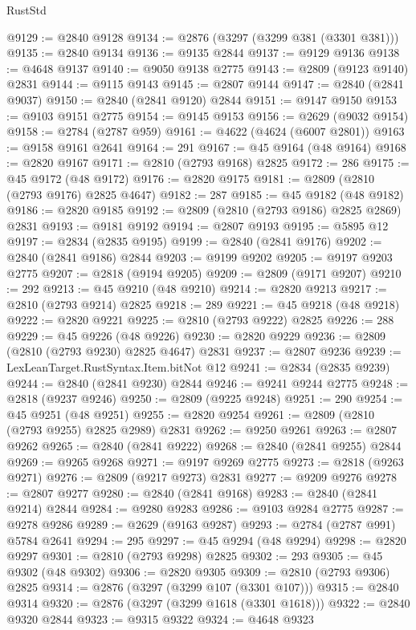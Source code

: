 \begin{lexlean}{RustStd}
\begin{coremodule}
{\begin{coremodule}
{{{{{{{{{{{{{{{{{{{{{{{{{{{{{{{{{@9129 := @2840 @9128
@9134 := @2876 (@3297 (@3299 @381 (@3301 @381)))
@9135 := @2840 @9134
@9136 := @9135 @2844
@9137 := @9129 @9136
@9138 := @4648 @9137
@9140 := @9050 @9138 @2775
@9143 := @2809 (@9123 @9140) @2831
@9144 := @9115 @9143
@9145 := @2807 @9144
@9147 := @2840 (@2841 @9037)
@9150 := @2840 (@2841 @9120) @2844
@9151 := @9147 @9150
@9153 := @9103 @9151 @2775
@9154 := @9145 @9153
@9156 := @2629 (@9032 @9154)
@9158 := @2784 (@2787 @959)
@9161 := @4622 (@4624 (@6007 @2801))
@9163 := @9158 @9161 @2641
@9164 := 291
@9167 := @45 @9164 (@48 @9164)
@9168 := @2820 @9167
@9171 := @2810 (@2793 @9168) @2825
@9172 := 286
@9175 := @45 @9172 (@48 @9172)
@9176 := @2820 @9175
@9181 := @2809 (@2810 (@2793 @9176) @2825 @4647)
@9182 := 287
@9185 := @45 @9182 (@48 @9182)
@9186 := @2820 @9185
@9192 := @2809 (@2810 (@2793 @9186) @2825 @2869) @2831
@9193 := @9181 @9192
@9194 := @2807 @9193
@9195 := @5895 @12
@9197 := @2834 (@2835 @9195)
@9199 := @2840 (@2841 @9176)
@9202 := @2840 (@2841 @9186) @2844
@9203 := @9199 @9202
@9205 := @9197 @9203 @2775
@9207 := @2818 (@9194 @9205)
@9209 := @2809 (@9171 @9207)
@9210 := 292
@9213 := @45 @9210 (@48 @9210)
@9214 := @2820 @9213
@9217 := @2810 (@2793 @9214) @2825
@9218 := 289
@9221 := @45 @9218 (@48 @9218)
@9222 := @2820 @9221
@9225 := @2810 (@2793 @9222) @2825
@9226 := 288
@9229 := @45 @9226 (@48 @9226)
@9230 := @2820 @9229
@9236 := @2809 (@2810 (@2793 @9230) @2825 @4647) @2831
@9237 := @2807 @9236
@9239 := LexLeanTarget.RustSyntax.Item.bitNot @12
@9241 := @2834 (@2835 @9239)
@9244 := @2840 (@2841 @9230) @2844
@9246 := @9241 @9244 @2775
@9248 := @2818 (@9237 @9246)
@9250 := @2809 (@9225 @9248)
@9251 := 290
@9254 := @45 @9251 (@48 @9251)
@9255 := @2820 @9254
@9261 := @2809 (@2810 (@2793 @9255) @2825 @2989) @2831
@9262 := @9250 @9261
@9263 := @2807 @9262
@9265 := @2840 (@2841 @9222)
@9268 := @2840 (@2841 @9255) @2844
@9269 := @9265 @9268
@9271 := @9197 @9269 @2775
@9273 := @2818 (@9263 @9271)
@9276 := @2809 (@9217 @9273) @2831
@9277 := @9209 @9276
@9278 := @2807 @9277
@9280 := @2840 (@2841 @9168)
@9283 := @2840 (@2841 @9214) @2844
@9284 := @9280 @9283
@9286 := @9103 @9284 @2775
@9287 := @9278 @9286
@9289 := @2629 (@9163 @9287)
@9293 := @2784 (@2787 @991) @5784 @2641
@9294 := 295
@9297 := @45 @9294 (@48 @9294)
@9298 := @2820 @9297
@9301 := @2810 (@2793 @9298) @2825
@9302 := 293
@9305 := @45 @9302 (@48 @9302)
@9306 := @2820 @9305
@9309 := @2810 (@2793 @9306) @2825
@9314 := @2876 (@3297 (@3299 @107 (@3301 @107)))
@9315 := @2840 @9314
@9320 := @2876 (@3297 (@3299 @1618 (@3301 @1618)))
@9322 := @2840 @9320 @2844
@9323 := @9315 @9322
@9324 := @4648 @9323
}}}}}}}}}}}}}}}}}}}}}}}}}}}}}}}}}
\end{coremodule}}
\end{coremodule}
\end{lexlean}
